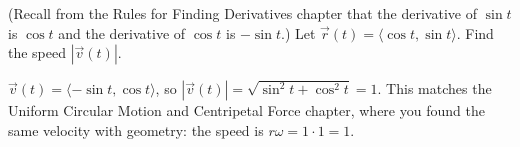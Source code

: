\begin{Exercise}[title={Circular Path}, label=vf1]
(Recall from the Rules for Finding Derivatives chapter that the derivative of
$\sin t$ is $\cos t$ and the derivative of $\cos t$ is $-\sin t$.)
Let $\vec{r}(t) = \langle \cos t, \sin t \rangle$. Find the speed $|\vec{v}(t)|$.
\end{Exercise}
\begin{Answer}[ref=vf1]
$\vec{v}(t) = \langle -\sin t, \cos t \rangle$, so $|\vec{v}(t)| = \sqrt{\sin^2 t + \cos^2 t} = 1$. This
matches the Uniform Circular Motion and Centripetal Force chapter, where you found the same velocity with geometry: the speed is
$r\omega = 1 \cdot 1 = 1$.
\end{Answer}
